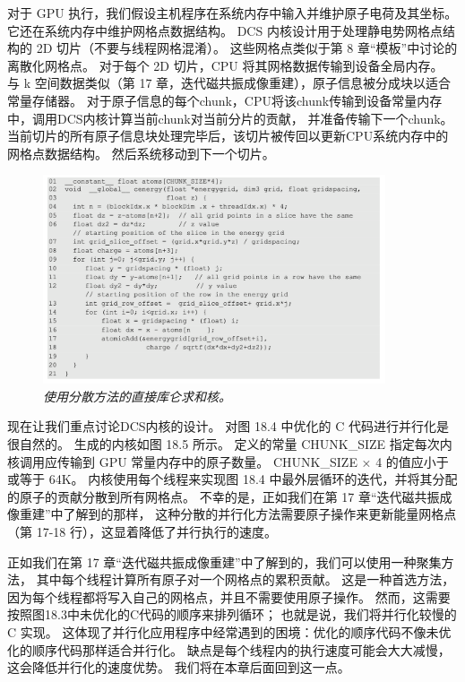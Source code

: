 对于 GPU 执行，我们假设主机程序在系统内存中输入并维护原子电荷及其坐标。 它还在系统内存中维护网格点数据结构。 
DCS 内核设计用于处理静电势网格点结构的 2D 切片（不要与线程网格混淆）。 
这些网格点类似于第 8 章“模板”中讨论的离散化网格点。 对于每个 2D 切片，CPU 将其网格数据传输到设备全局内存。 
与 k 空间数据类似（第 17 章，迭代磁共振成像重建），原子信息被分成块以适合常量存储器。 
对于原子信息的每个chunk，CPU将该chunk传输到设备常量内存中，调用DCS内核计算当前chunk对当前分片的贡献，
并准备传输下一个chunk。 当前切片的所有原子信息块处理完毕后，该切片被传回以更新CPU系统内存中的网格点数据结构。 
然后系统移动到下一个切片。

\begin{figure}[H]
	\centering
	\includegraphics[width=0.9\textwidth]{figs/F18.5.png}
	\caption{\textit{使用分散方法的直接库仑求和核。}}
\end{figure}

现在让我们重点讨论DCS内核的设计。 对图 18.4 中优化的 C 代码进行并行化是很自然的。 生成的内核如图 18.5 所示。 
定义的常量 CHUNK\_SIZE 指定每次内核调用应传输到 GPU 常量内存中的原子数量。 CHUNK\_SIZE × 4 的值应小于或等于 64K。 
内核使用每个线程来实现图 18.4 中最外层循环的迭代，并将其分配的原子的贡献分散到所有网格点。 
不幸的是，正如我们在第 17 章“迭代磁共振成像重建”中了解到的那样，
这种分散的并行化方法需要原子操作来更新能量网格点（第 17-18 行），这显着降低了并行执行的速度。

正如我们在第 17 章“迭代磁共振成像重建”中了解到的，我们可以使用一种聚集方法，
其中每个线程计算所有原子对一个网格点的累积贡献。 
这是一种首选方法，因为每个线程都将写入自己的网格点，并且不需要使用原子操作。 
然而，这需要按照图18.3中未优化的C代码的顺序来排列循环； 也就是说，我们将并行化较慢的 C 实现。 
这体现了并行化应用程序中经常遇到的困境：优化的顺序代码不像未优化的顺序代码那样适合并行化。 
缺点是每个线程内的执行速度可能会大大减慢，这会降低并行化的速度优势。 我们将在本章后面回到这一点。

